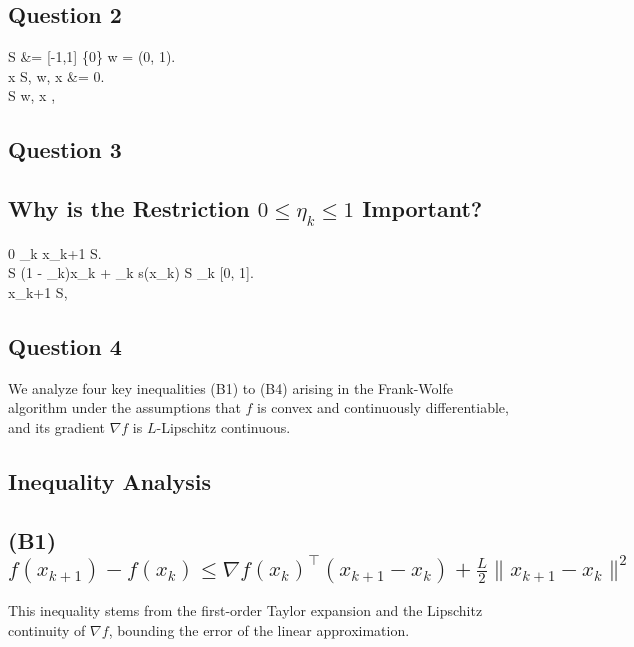 \documentclass[12p]{article}
\begin{document}
\subsection*{Question 2} 
 S &= [-1,1] \times \{0\}  w = (0, 1). \\
 x \in S,  \langle w, x \rangle &= 0. \\
 S  \langle w, x \rangle, 


\subsection*{Question 3} 

\subsection*{Why is the Restriction \( 0 \leq \eta_k \leq 1 \) Important?}
 0 \leq \eta_k   x_{k+1}  S. \\
 S  (1 - \eta_k)x_k + \eta_k s(x_k)  S  \eta_k  [0, 1]. \\
 x_{k+1}  S, 

\subsection*{Question 4} 

We analyze four key inequalities (B1) to (B4) arising in the Frank-Wolfe algorithm under the assumptions that \( f \) is convex and continuously differentiable, and its gradient \( \nabla f \) is \( L \)-Lipschitz continuous.

\subsection*{Inequality Analysis}

\subsection*{(B1) \( f(x_{k+1}) - f(x_k) \leq \nabla f(x_k)^\top (x_{k+1} - x_k) + \frac{L}{2} \|x_{k+1} - x_k\|^2 \)}
This inequality stems from the first-order Taylor expansion and the Lipschitz continuity of \( \nabla f \), bounding the error of the linear approximation.
\end{document}
